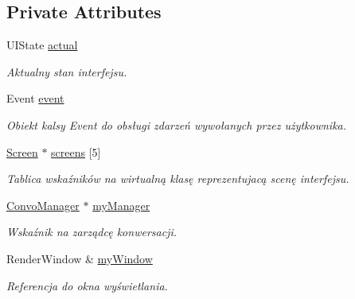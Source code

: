 \subsection*{Private Attributes}
\begin{DoxyCompactItemize}
\item 
\mbox{\label{class_u_i_aa4256494d1f128336a99d4fa467192e1}} 
U\+I\+State \mbox{\hyperlink{class_u_i_aa4256494d1f128336a99d4fa467192e1}{actual}}
\begin{DoxyCompactList}\small\item\em Aktualny stan interfejsu. \end{DoxyCompactList}\item 
\mbox{\label{class_u_i_af13c87cd0e8f81e26542fb119a52d713}} 
Event \mbox{\hyperlink{class_u_i_af13c87cd0e8f81e26542fb119a52d713}{event}}
\begin{DoxyCompactList}\small\item\em Obiekt kalsy Event do obsługi zdarzeń wywołanych przez użytkownika. \end{DoxyCompactList}\item 
\mbox{\label{class_u_i_a42f0f8ac80e62f581df46e7fe8da29ba}} 
\mbox{\hyperlink{class_screen}{Screen}} $\ast$ \mbox{\hyperlink{class_u_i_a42f0f8ac80e62f581df46e7fe8da29ba}{screens}} \mbox{[}5\mbox{]}
\begin{DoxyCompactList}\small\item\em Tablica wskaźników na wirtualną klasę reprezentujacą scenę interfejsu. \end{DoxyCompactList}\item 
\mbox{\label{class_u_i_a4e25d54a27661f755e5fbd23dce188c8}} 
\mbox{\hyperlink{class_convo_manager}{Convo\+Manager}} $\ast$ \mbox{\hyperlink{class_u_i_a4e25d54a27661f755e5fbd23dce188c8}{my\+Manager}}
\begin{DoxyCompactList}\small\item\em Wskaźnik na zarządcę konwersacji. \end{DoxyCompactList}\item 
\mbox{\label{class_u_i_a5e99127735bd5a083148bf330fc85bae}} 
Render\+Window \& \mbox{\hyperlink{class_u_i_a5e99127735bd5a083148bf330fc85bae}{my\+Window}}
\begin{DoxyCompactList}\small\item\em Referencja do okna wyświetlania. \end{DoxyCompactList}\end{DoxyCompactItemize}



